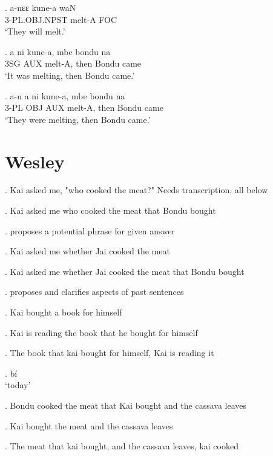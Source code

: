 \documentclass{assets/fieldnotes}
\begin{document}
\exg.
a-nɛɛ           kune-a   waN \\
3-PL.OBJ.NPST   melt-A   FOC \\%
`They will melt.'

\exg.
a     ni    kune-a,   mbe    bondu   na   \\
3SG   AUX   melt-A,   then   Bondu   came \\%
`It was melting, then Bondu came.'

\exg.
a-n    a     ni    kune-a,   mbe    bondu   na   \\
3-PL   OBJ   AUX   melt-A,   then   Bondu   came \\%
`They were melting, then Bondu came.' \label{31232}



\section{Wesley}


\ex. Kai asked me, "who cooked the meat?"
{ Needs transcription, all below}

\ex. Kai asked me who cooked the meat that Bondu bought

\exg. proposes a potential phrase for given answer 

\ex. Kai asked me whether Jai cooked the meat 

\ex. Kai asked me whether Jai cooked the meat that Bondu bought

\exg. proposes and clarifies aspects of past sentences

\ex. Kai bought a book for himself 

\ex. Kai is reading the book that he bought for himself 

\ex. The book that kai bought for himself, Kai is reading it

\exg. bí \\
`today'

\ex. Bondu cooked the meat that Kai bought and the cassava leaves 

\ex. Kai bought the meat and the cassava leaves 

\ex. The meat that kai bought, and the cassava leaves, kai cooked
\end{document}
